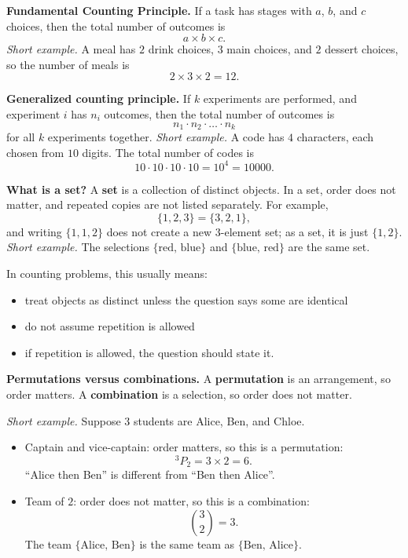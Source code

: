 \documentclass[12pt]{article}
\begin{document}
\textbf{Fundamental Counting Principle.} If a task has stages with $a$, $b$, and $c$ choices, then the total number of outcomes is
\[
a \times b \times c.
\]
\textit{Short example.} A meal has $2$ drink choices, $3$ main choices, and $2$ dessert choices, so the number of meals is
\[
2\times 3\times 2=12.
\]

\textbf{Generalized counting principle.} If $k$ experiments are performed, and experiment $i$ has $n_i$ outcomes, then the total number of outcomes is
\[
n_1\cdot n_2\cdot \dots \cdot n_k
\]
for all $k$ experiments together.
\textit{Short example.} A code has $4$ characters, each chosen from $10$ digits. The total number of codes is
\[
10\cdot 10\cdot 10\cdot 10=10^4=10000.
\]

\textbf{What is a set?} A \textbf{set} is a collection of distinct objects. In a set, order does not matter, and repeated copies are not listed separately. For example,
\[
\{1,2,3\}=\{3,2,1\},
\]
and writing $\{1,1,2\}$ does not create a new $3$-element set; as a set, it is just $\{1,2\}$.
\textit{Short example.} The selections $\{\text{red, blue}\}$ and $\{\text{blue, red}\}$ are the same set.

In counting problems, this usually means:
\begin{itemize}[leftmargin=*]
  \item treat objects as distinct unless the question says some are identical
  \item do not assume repetition is allowed
  \item if repetition is allowed, the question should state it.
\end{itemize}

\textbf{Permutations versus combinations.} A \textbf{permutation} is an arrangement, so order matters. A \textbf{combination} is a selection, so order does not matter.

\textit{Short example.} Suppose $3$ students are Alice, Ben, and Chloe.
\begin{itemize}[leftmargin=*]
  \item Captain and vice-captain: order matters, so this is a permutation:
  \[
  {}^3P_2 = 3\times 2 = 6.
  \]
  ``Alice then Ben'' is different from ``Ben then Alice''.

  \item Team of $2$: order does not matter, so this is a combination:
  \[
  \binom{3}{2}=3.
  \]
  The team $\{\text{Alice, Ben}\}$ is the same team as $\{\text{Ben, Alice}\}$.
\end{itemize}
\end{document}
